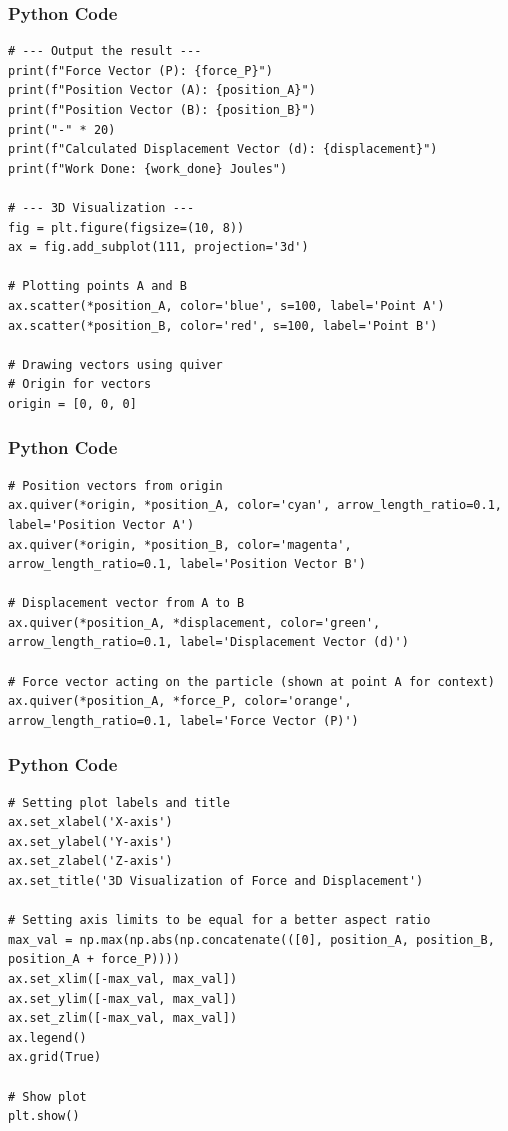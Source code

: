 \documentclass{beamer}
\begin{document}
\begin{frame}[fragile]
\frametitle{Python Code}
\begin{lstlisting}
# --- Output the result ---
print(f"Force Vector (P): {force_P}")
print(f"Position Vector (A): {position_A}")
print(f"Position Vector (B): {position_B}")
print("-" * 20)
print(f"Calculated Displacement Vector (d): {displacement}")
print(f"Work Done: {work_done} Joules")

# --- 3D Visualization ---
fig = plt.figure(figsize=(10, 8))
ax = fig.add_subplot(111, projection='3d')

# Plotting points A and B
ax.scatter(*position_A, color='blue', s=100, label='Point A')
ax.scatter(*position_B, color='red', s=100, label='Point B')

# Drawing vectors using quiver
# Origin for vectors
origin = [0, 0, 0]
\end{lstlisting}
\end{frame}
\begin{frame}[fragile]
\frametitle{Python Code}
\begin{lstlisting}
# Position vectors from origin
ax.quiver(*origin, *position_A, color='cyan', arrow_length_ratio=0.1, label='Position Vector A')
ax.quiver(*origin, *position_B, color='magenta', arrow_length_ratio=0.1, label='Position Vector B')

# Displacement vector from A to B
ax.quiver(*position_A, *displacement, color='green', arrow_length_ratio=0.1, label='Displacement Vector (d)')

# Force vector acting on the particle (shown at point A for context)
ax.quiver(*position_A, *force_P, color='orange', arrow_length_ratio=0.1, label='Force Vector (P)')
\end{lstlisting}
\end{frame}
\begin{frame}[fragile]
\frametitle{Python Code}
\begin{lstlisting}
# Setting plot labels and title
ax.set_xlabel('X-axis')
ax.set_ylabel('Y-axis')
ax.set_zlabel('Z-axis')
ax.set_title('3D Visualization of Force and Displacement')

# Setting axis limits to be equal for a better aspect ratio
max_val = np.max(np.abs(np.concatenate(([0], position_A, position_B, position_A + force_P))))
ax.set_xlim([-max_val, max_val])
ax.set_ylim([-max_val, max_val])
ax.set_zlim([-max_val, max_val])
ax.legend()
ax.grid(True)

# Show plot
plt.show()
\end{lstlisting}
\end{frame}
\end{document}
